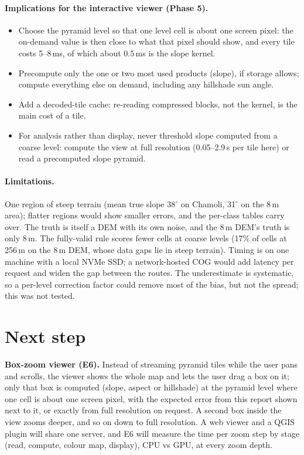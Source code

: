 ﻿\documentclass[11pt,a4paper]{article}
\begin{document}
\paragraph{Implications for the interactive viewer (Phase 5).}
\begin{itemize}
  \item Choose the pyramid level so that one level cell is about one screen pixel: the on-demand value is then
  close to what that pixel should show, and every tile costs 5--8\,ms, of which about 0.5\,ms is the slope kernel.
  \item Precompute only the one or two most used products (slope), if storage allows; compute everything else on
  demand, including any hillshade sun angle.
  \item Add a decoded-tile cache: re-reading compressed blocks, not the kernel, is the main cost of a tile.
  \item For analysis rather than display, never threshold slope computed from a coarse level: compute the view at full
  resolution (0.05--2.9\,s per tile here) or read a precomputed slope pyramid.
\end{itemize}

\paragraph{Limitations.} One region of steep terrain (mean true slope 38$^\circ$ on Chamoli, 31$^\circ$ on the 8\,m
area); flatter regions would show smaller errors, and the per-class tables carry over. The truth is itself a DEM
with its own noise, and the 8\,m DEM's truth is only 8\,m. The fully-valid rule scores fewer cells at coarse
levels (17\% of cells at 256\,m on the 8\,m DEM, whose data gaps lie in steep terrain). Timing is on one machine with
a local NVMe SSD; a network-hosted COG would add latency per request and widen the gap between the routes. The
underestimate is systematic, so a per-level correction factor could remove most of the bias, but not the spread;
this was not tested.

\section{Next step}
\textbf{Box-zoom viewer (E6).} Instead of streaming pyramid tiles while the user pans and scrolls, the viewer shows
the whole map and lets the user drag a box on it; only that box is computed (slope, aspect or hillshade) at the
pyramid level where one cell is about one screen pixel, with the expected error from this report shown next to it,
or exactly from full resolution on request. A second box inside the view zooms deeper, and so on down to full
resolution. A web viewer and a QGIS plugin will share one server, and E6 will measure the time per zoom step by stage
(read, compute, colour map, display), CPU vs GPU, at every zoom depth.
\end{document}
